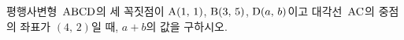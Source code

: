 평행사변형~$\mathrm{ABCD}$의 세 꼭짓점이 $\mathrm{A}(1,\,1)$, $\mathrm{B}(3,\,5)$, $\mathrm{D}(a,\,b)$이고 대각선~$\mathrm{AC}$의 중점의 좌표가 $(4,\,2)$일 때, $a+b$의 값을 구하시오.
